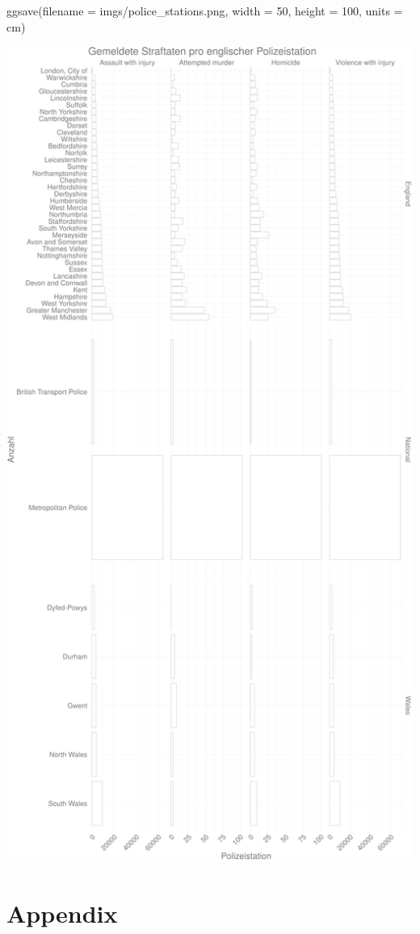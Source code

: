 \documentclass[
]{book}
\newenvironment{Shaded}{\begin{snugshade}}{\end{snugshade}}
\newcommand{\AttributeTok}[1]{\textcolor[rgb]{0.77,0.63,0.00}{#1}}
\newcommand{\DecValTok}[1]{\textcolor[rgb]{0.00,0.00,0.81}{#1}}
\newcommand{\FunctionTok}[1]{\textcolor[rgb]{0.00,0.00,0.00}{#1}}
\newcommand{\NormalTok}[1]{#1}
\newcommand{\StringTok}[1]{\textcolor[rgb]{0.31,0.60,0.02}{#1}}
\begin{document}
\begin{Shaded}
\begin{Highlighting}[]
\FunctionTok{ggsave}\NormalTok{(}\AttributeTok{filename =} \StringTok{\textquotesingle{}imgs/police\_stations.png\textquotesingle{}}\NormalTok{,}
      \AttributeTok{width =} \DecValTok{50}\NormalTok{,}
      \AttributeTok{height =} \DecValTok{100}\NormalTok{,}
      \AttributeTok{units =} \StringTok{\textquotesingle{}cm\textquotesingle{}}\NormalTok{)}
\end{Highlighting}
\end{Shaded}

\begin{center}\includegraphics[width=.8\textwidth]{imgs/police_stations} \end{center}

\hypertarget{appendix}{%
\chapter{Appendix}\label{appendix}}

  
\end{document}
